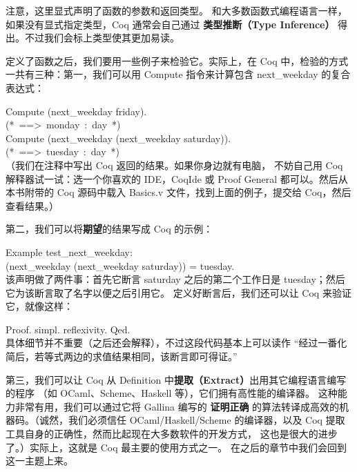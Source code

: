 \documentclass[utf8]{ctexart}
\begin{document}
注意，这里显式声明了函数的参数和返回类型。
和大多数函数式编程语言一样，如果没有显式指定类型，Coq 通常会自己通过
\textbf{类型推断（Type Inference）}
得出。不过我们会标上类型使其更加易读。

定义了函数之后，我们要用一些例子来检验它。实际上，在 Coq
中，检验的方式一共有三种：第一，我们可以用 {{Compute}} 指令来计算包含
{{next\_weekday}} 的复合表达式：

{Compute} ({next\_weekday} {friday}).\\
{(*~==\textgreater~monday~:~day~*)}\\


{Compute} ({next\_weekday} ({next\_weekday} {saturday})).\\
{(*~==\textgreater~tuesday~:~day~*)}\\

（我们在注释中写出 Coq 返回的结果。如果你身边就有电脑， 不妨自己用 Coq
解释器试一试：选一个你喜欢的 IDE，CoqIde 或 Proof General
都可以。然后从本书附带的 Coq 源码中载入 {{Basics.v}}
文件，找到上面的例子，提交给 Coq，然后查看结果。）

第二，我们可以将\textbf{期望}的结果写成 Coq 的示例：

{Example} {test\_next\_weekday}:\\
\hspace*{0.333em}\hspace*{0.333em}({next\_weekday} ({next\_weekday}
{saturday})) = {tuesday}.\\

该声明做了两件事：首先它断言 {{saturday}} 之后的第二个工作日是
{{tuesday}}；然后它为该断言取了名字以便之后引用它。
定义好断言后，我们还可以让 Coq 来验证它，就像这样：

{Proof}. {simpl}. {reflexivity}. {Qed}.\\

具体细节并不重要（之后还会解释），不过这段代码基本上可以读作
``经过一番化简后，若等式两边的求值结果相同，该断言即可得证。''

第三，我们可以让 Coq 从 {{Definition}}
中\textbf{提取（Extract）}出用其它编程语言编写的程序 （如
OCaml、Scheme、Haskell 等），它们拥有高性能的编译器。
这种能力非常有用，我们可以通过它将 Gallina 编写的 \textbf{证明正确}
的算法转译成高效的机器码。（诚然，我们必须信任 OCaml/Haskell/Scheme
的编译器，以及 Coq
提取工具自身的正确性，然而比起现在大多数软件的开发方式，
这也是很大的进步了。）实际上，这就是 Coq 最主要的使用方式之一。
在之后的章节中我们会回到这一主题上来。
\end{document}
